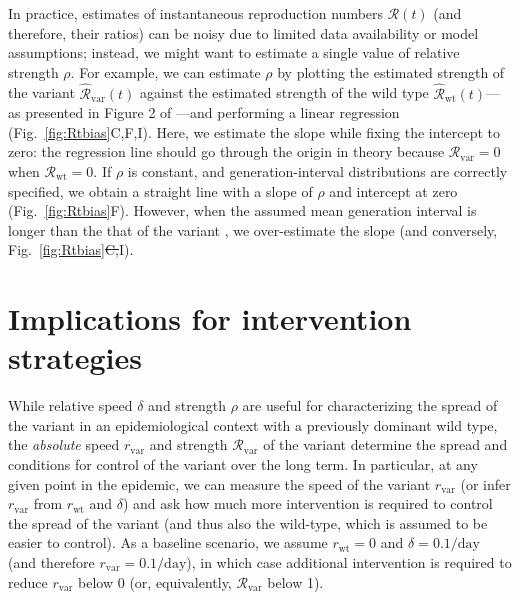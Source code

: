 \documentclass[12pt]{article}
\newcommand{\fref}[1]{Fig.~\ref{fig:#1}}
\newcommand{\vvvar}{\mathrm{var}}
\newcommand{\wwwt}{\mathrm{wt}}
\newcommand{\rx}[1]{\ensuremath{{r}_{#1}}\xspace}
\newcommand{\rw}{\rx{\wwwt}}
\newcommand{\rv}{\rx{\vvvar}}
\newcommand{\Rx}[1]{\ensuremath{{\mathcal R}_{#1}}\xspace}
\newcommand{\RR}{\ensuremath{{\mathcal R}}\xspace}
\newcommand{\Rw}{\Rx{\wwwt}}
\newcommand{\Rv}{\Rx{\vvvar}}
\newcommand{\pday}{\ensuremath{/\textrm{day}}}
\providecommand{\DIFaddtex}[1]{{\protect\color{blue}\uwave{#1}}} %
\providecommand{\DIFdeltex}[1]{{\protect\color{red}\sout{#1}}}                      %
\providecommand{\DIFaddbegin}{} %
\providecommand{\DIFaddend}{} %
\providecommand{\DIFdelbegin}{} %
\providecommand{\DIFdelend}{} %
\providecommand{\DIFadd}[1]{\texorpdfstring{\DIFaddtex{#1}}{#1}} %
\providecommand{\DIFdel}[1]{\texorpdfstring{\DIFdeltex{#1}}{}} %
\newcommand{\DIFscaledelfig}{0.5}
\newlength{\DIFdelgraphicswidth} %
\newlength{\DIFdelgraphicsheight} %
\newcommand{\DIFaddincludegraphics}[2][]{{\color{blue}\fbox{\DIFOincludegraphics[#1]{#2}}}} %
\newcommand{\DIFdelincludegraphics}[2][]{%
\sbox{\DIFdelgraphicsbox}{\DIFOincludegraphics[#1]{#2}}%
\settoboxwidth{\DIFdelgraphicswidth}{\DIFdelgraphicsbox} %
\settoboxtotalheight{\DIFdelgraphicsheight}{\DIFdelgraphicsbox} %
\scalebox{\DIFscaledelfig}{%
\parbox[b]{\DIFdelgraphicswidth}{\usebox{\DIFdelgraphicsbox}\\[-\baselineskip] \rule{\DIFdelgraphicswidth}{0em}}\llap{\resizebox{\DIFdelgraphicswidth}{\DIFdelgraphicsheight}{%
\setlength{\unitlength}{\DIFdelgraphicswidth}%
\begin{picture}(1,1)%
\thicklines\linethickness{2pt} %
{\color[rgb]{1,0,0}\put(0,0){\framebox(1,1){}}}%
{\color[rgb]{1,0,0}\put(0,0){\line( 1,1){1}}}%
{\color[rgb]{1,0,0}\put(0,1){\line(1,-1){1}}}%
\end{picture}%
}\hspace*{3pt}}} %
} %
\DeclareRobustCommand{\DIFaddbegin}{\DIFOaddbegin \let\includegraphics\DIFaddincludegraphics} %
\DeclareRobustCommand{\DIFaddend}{\DIFOaddend \let\includegraphics\DIFOincludegraphics} %
\DeclareRobustCommand{\DIFdelbegin}{\DIFOdelbegin \let\includegraphics\DIFdelincludegraphics} %
\DeclareRobustCommand{\DIFdelend}{\DIFOaddend \let\includegraphics\DIFOincludegraphics} %
\begin{document}
In practice, estimates of instantaneous reproduction numbers $\RR(t)$ (and therefore, their ratios) can be noisy due to limited data availability or model assumptions;
instead, we might want to estimate a single value of relative strength $\rho$.
For example, we can estimate $\rho$ by plotting the estimated strength of the variant $\hat{\RR}_{\textrm{var}}(t)$ against the estimated strength of the wild type $\hat{\RR}_{\textrm{wt}}(t)$---as presented in Figure 2 of \cite{volz2021transmission}---and performing a linear regression (\fref{Rtbias}C,F,I).
Here, we estimate the slope while fixing the intercept to zero: the regression line should go through the origin in theory because $\Rv = 0$ when $\Rw = 0$.
If $\rho$ is constant, and generation-interval distributions are correctly specified, we obtain a straight line with a slope of $\rho$ and intercept at zero (\fref{Rtbias}F).
However, when the assumed mean generation interval is longer than the that of the variant \DIFaddbegin \DIFadd{(\fref{Rtbias}C)}\DIFaddend , we over-estimate the slope (and conversely, \fref{Rtbias}\DIFdelbegin \DIFdel{C,}\DIFdelend I).

\section{Implications for intervention strategies}

While relative speed $\delta$ and strength $\rho$ are useful for characterizing the spread of the variant in an epidemiological context with a previously dominant wild type, the \emph{absolute} speed $\rv$ and strength $\Rv$ of the variant determine the spread and conditions for control of the variant over the long term.
In particular, at any given point in the epidemic, we can measure the speed of the variant $\rv$ (or infer $\rv$ from $\rw$ and $\delta$) and ask how much more intervention is required to control the spread of the variant (and thus also the wild-type, which is assumed to be easier to control). 
As a baseline scenario, we assume $\rw=0$ and $\delta=0.1\pday$ (and therefore $\rv=0.1\pday$), in which case additional intervention is required to reduce $\rv$ below 0 (or, equivalently, $\Rv$ below 1).
\end{document}
